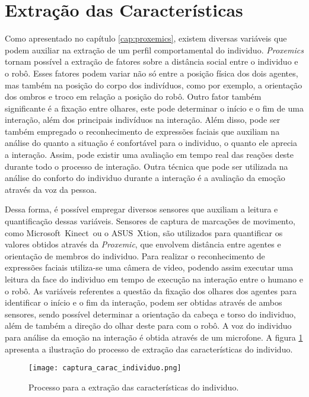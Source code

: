 \section{Extração das Características}
\label{sec:extracaocaracteristicas}

Como apresentado no capítulo \ref{cap:proxemics}, existem diversas variáveis que podem auxiliar na extração de um perfil comportamental do individuo. \emph{Proxemics} tornam possível a extração de fatores sobre a distância social entre o individuo e o robô. Esses fatores podem variar não só entre a posição física dos dois agentes, mas também na posição do corpo dos indivíduos, como por exemplo, a orientação dos ombros e troco em relação a posição do robô. Outro fator também significante é a fixação entre olhares, este pode determinar o início e o fim de uma interação, além dos principais indivíduos na interação. Além disso, pode ser também empregado o reconhecimento de expressões faciais que auxiliam na análise do quanto a situação é confortável para o individuo, o quanto ele aprecia a interação. Assim, pode existir uma avaliação em tempo real das reações deste durante todo o processo de interação. Outra técnica que pode ser utilizada na análise do conforto do individuo durante a interação é a avaliação da emoção através da voz da pessoa.

Dessa forma, é possível empregar diversos sensores que auxiliam a leitura e quantificação dessas variáveis. Sensores de captura de marcações de movimento, como Microsoft\textregistered\ Kinect\textregistered\ ou o ASUS\textregistered\ Xtion\textregistered, são utilizados para quantificar os valores obtidos através da \emph{Proxemic}, que envolvem distância entre agentes e orientação de membros do individuo. Para realizar o reconhecimento de expressões faciais utiliza-se uma câmera de video, podendo assim executar uma leitura da face do individuo em tempo de execução na interação entre o humano e o robô. As variáveis referentes a questão da fixação dos olhares dos agentes para identificar o início e o fim da interação, podem ser obtidas através de ambos sensores, sendo possível determinar a orientação da cabeça e torso do individuo, além de também a direção do olhar deste para com o robô. A voz do individuo para análise da emoção na interação é obtida através de um microfone. A figura \ref{fig:capturacaracteristicas} apresenta a ilustração do processo de extração das características do individuo.

\begin{figure}[ht!]
	\centering
	\texttt{[image: captura\_carac\_individuo.png]}
	\caption{Processo para a extração das características do individuo.}
	\label{fig:capturacaracteristicas}
\end{figure}

